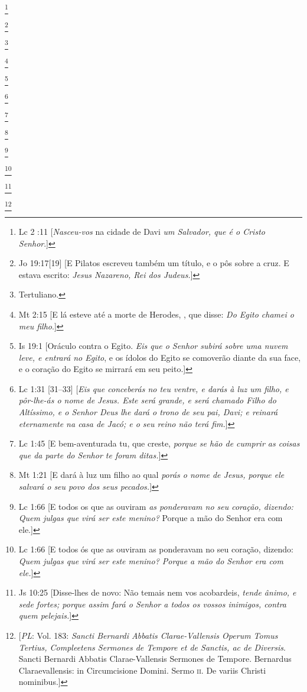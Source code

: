 \footnote{Lc 2 :11 [\textit{Nasceu-vos} na cidade de Davi \textit{um Salvador, que é o Cristo Senhor}.]}

\footnote{Jo 19:17[19] [E Pilatos escreveu também um título, e o pôs sobre a cruz. E estava escrito: \textit{Jesus Nazareno, Rei dos Judeus.}]}

\footnote{Tertuliano.}

\footnote{Mt 2:15 [E lá esteve até a morte de Herodes, , que disse: \textit{Do Egito chamei o meu filho}.]}

\footnote{Is 19:1 [Oráculo contra o Egito. \textit{Eis que o Senhor subirá sobre uma nuvem leve, e entrará no Egito}, e os ídolos do Egito se comoverão diante da sua face, e o coração do Egito se mirrará em seu peito.]}
 
\footnote{Lc 1:31 [31--33] [\textit{Eis que conceberás no teu ventre, e darás à luz um filho, e pôr-lhe-ás o nome de Jesus. Este será grande, e será chamado Filho do Altíssimo, e o Senhor Deus lhe dará o trono de seu pai, Davi; e reinará eternamente na casa de Jacó; e o seu reino não terá fim.}]}

\footnote{Lc 1:45 [E bem-aventurada tu, que creste, \textit{porque se hão de cumprir as coisas que da parte do Senhor te foram ditas.}]}

\footnote{Mt 1:21 [E dará à luz um filho ao qual \textit{porás o nome de Jesus, porque ele salvará o seu povo dos seus pecados.}]}

\footnote{Lc 1:66 [E todos os que as ouviram \textit{as ponderavam no seu coração, dizendo: Quem julgas que virá ser este menino?} Porque a mão do Senhor era com ele.]}

\footnote{Lc 1:66 [E todos ós que as ouviram as ponderavam no seu coração, dizendo: \textit{Quem julgas que virá ser este menino? Porque a mão do Senhor era com ele.}]}

\footnote{Js 10:25 [Disse-lhes de novo: Não temais nem vos acobardeis, \textit{tende ânimo, e sede fortes; porque assim fará o Senhor a todos os vossos inimigos, contra quem pelejais.}]}

\footnote{[\textit{PL}: Vol. 183: \textit{Sancti Bernardi Abbatis Clarae-Vallensis Operum Tomus Tertius, Compleetens Sermones de Tempore et de Sanctis, ac de Diversis}. Sancti Bernardi Abbatis Clarae-Vallensis Sermones de Tempore. Bernardus Claraevallensis: in Circumcisione Domini. Sermo \textsc{ii}. De variis Christi nominibus.]}
